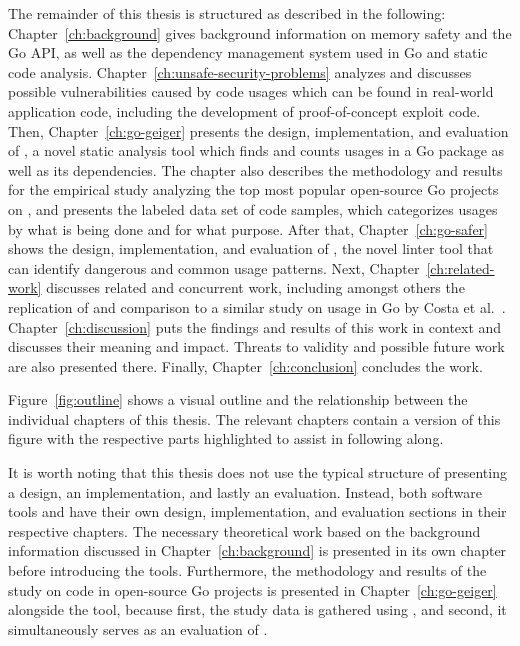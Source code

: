 The remainder of this thesis is structured as described in the following: Chapter~\ref{ch:background} gives background
information on memory safety and the Go \unsafe{} \acrshort{API}, as well as the dependency management system used in
Go and static code analysis.
Chapter~\ref{ch:unsafe-security-problems} analyzes and discusses possible vulnerabilities caused by \unsafe{} code
usages which can be found in real-world application code, including the development of proof-of-concept exploit code.
Then, Chapter~\ref{ch:go-geiger} presents the design, implementation, and evaluation of \toolGeiger, a novel static
analysis tool which finds and counts \unsafe{} usages in a Go package as well as its dependencies.
The chapter also describes the methodology and results for the empirical study analyzing the top \projsTotal{} most
popular open-source Go projects on \github{}, and presents the labeled data set of \numberLabeledCodeSnippets{} code
samples, which categorizes \unsafe{} usages by what is being done and for what purpose.
After that, Chapter~\ref{ch:go-safer} shows the design, implementation, and evaluation of \toolSafer, the novel linter
tool that can identify  dangerous and common \unsafe{} usage patterns.
Next, Chapter~\ref{ch:related-work} discusses related and concurrent work, including amongst others the replication of
and comparison to a similar study on \unsafe{} usage in Go by Costa et al.~\cite{costa2020}.
Chapter~\ref{ch:discussion} puts the findings and results of this work in context and discusses their meaning and
impact.
Threats to validity and possible future work are also presented there.
Finally, Chapter~\ref{ch:conclusion} concludes the work.

Figure~\ref{fig:outline} shows a visual outline and the relationship between the individual chapters of this thesis.
The relevant chapters contain a version of this figure with the respective parts highlighted to assist in following
along.



It is worth noting that this thesis does not use the typical structure of presenting a design, an implementation, and
lastly an evaluation.
Instead, both software tools \toolGeiger{} and \toolSafer{} have their own design, implementation, and evaluation
sections in their respective chapters.
The necessary theoretical work based on the background information discussed in Chapter~\ref{ch:background} is presented
in its own chapter before introducing the tools.
Furthermore, the methodology and results of the study on \unsafe{} code in open-source Go projects is presented in
Chapter~\ref{ch:go-geiger} alongside the \toolGeiger{} tool, because first, the study data is gathered using \toolGeiger,
and second, it simultaneously serves as an evaluation of \toolGeiger{}.
